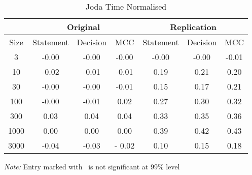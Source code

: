 \begin{table}[h]
	\caption{Joda Time Normalised}
	\label{tab:jodanorm}
	\begin{minipage}{0.7\columnwidth}
		\begin{center}
			\begin{tabular}{cccc|ccc}
				\toprule
				& \multicolumn{3}{c}{Original} & \multicolumn{3}{c}{Replication} \\
				\hline
				Size & Statement & Decision & MCC & Statement & Decision & MCC  \\
				\hline
				3   & -0.00\textborn & -0.00\textborn & -0.00\textborn & -0.00\textborn & -0.00\textborn & -0.01\textborn \\
				10  & -0.02\textborn & -0.01\textborn & -0.01\textborn & 0.19 & 0.21 & 0.20\\
				30  & -0.00\textborn & -0.00\textborn & -0.01\textborn & 0.15 & 0.17  & 0.21 \\
				100 & -0.00\textborn & -0.01\textborn & 0.02\textborn & 0.27  & 0.30  & 0.32 \\
				300 & 0.03\textborn & 0.04\textborn & 0.04\textborn & 0.33\textborn  & 0.35  & 0.36 \\
				1000 & 0.00\textborn & 0.00\textborn & 0.00\textborn & 0.39  & 0.42 & 0.43 \\
				3000 & -0.04\textborn & -0.03\textborn & - 0.02\textborn &0.10 & 0.15 & 0.18\\
				\bottomrule
			\end{tabular}
		\end{center}
		\bigskip
		\emph{Note:} Entry marked with \textborn~is not significant at 99\% level
	\end{minipage}
\end{table}

